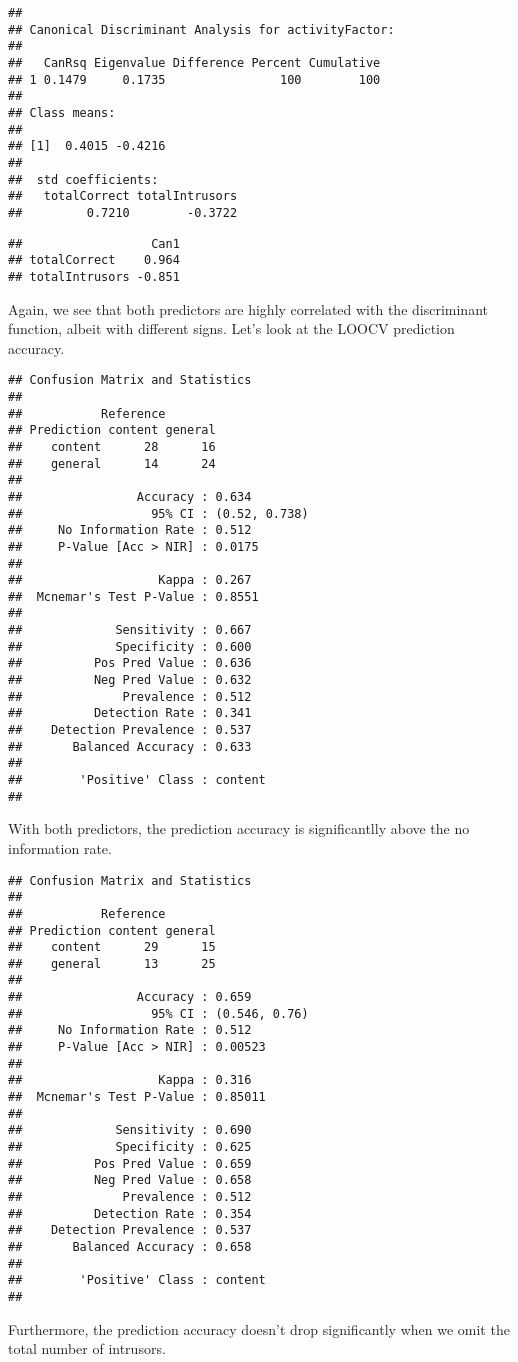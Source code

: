 \documentclass[11pt,]{article}
\begin{document}
\begin{verbatim}
## 
## Canonical Discriminant Analysis for activityFactor:
## 
##   CanRsq Eigenvalue Difference Percent Cumulative
## 1 0.1479     0.1735                100        100
## 
## Class means:
## 
## [1]  0.4015 -0.4216
## 
##  std coefficients:
##   totalCorrect totalIntrusors 
##         0.7210        -0.3722
\end{verbatim}

\begin{verbatim}
##                  Can1
## totalCorrect    0.964
## totalIntrusors -0.851
\end{verbatim}

Again, we see that both predictors are highly correlated with the
discriminant function, albeit with different signs. Let's look at the
LOOCV prediction accuracy.

\begin{verbatim}
## Confusion Matrix and Statistics
## 
##           Reference
## Prediction content general
##    content      28      16
##    general      14      24
##                                        
##                Accuracy : 0.634        
##                  95% CI : (0.52, 0.738)
##     No Information Rate : 0.512        
##     P-Value [Acc > NIR] : 0.0175       
##                                        
##                   Kappa : 0.267        
##  Mcnemar's Test P-Value : 0.8551       
##                                        
##             Sensitivity : 0.667        
##             Specificity : 0.600        
##          Pos Pred Value : 0.636        
##          Neg Pred Value : 0.632        
##              Prevalence : 0.512        
##          Detection Rate : 0.341        
##    Detection Prevalence : 0.537        
##       Balanced Accuracy : 0.633        
##                                        
##        'Positive' Class : content      
## 
\end{verbatim}

With both predictors, the prediction accuracy is significantlly above
the no information rate.

\begin{verbatim}
## Confusion Matrix and Statistics
## 
##           Reference
## Prediction content general
##    content      29      15
##    general      13      25
##                                        
##                Accuracy : 0.659        
##                  95% CI : (0.546, 0.76)
##     No Information Rate : 0.512        
##     P-Value [Acc > NIR] : 0.00523      
##                                        
##                   Kappa : 0.316        
##  Mcnemar's Test P-Value : 0.85011      
##                                        
##             Sensitivity : 0.690        
##             Specificity : 0.625        
##          Pos Pred Value : 0.659        
##          Neg Pred Value : 0.658        
##              Prevalence : 0.512        
##          Detection Rate : 0.354        
##    Detection Prevalence : 0.537        
##       Balanced Accuracy : 0.658        
##                                        
##        'Positive' Class : content      
## 
\end{verbatim}

Furthermore, the prediction accuracy doesn't drop significantly when we
omit the total number of intrusors.



\end{document}
